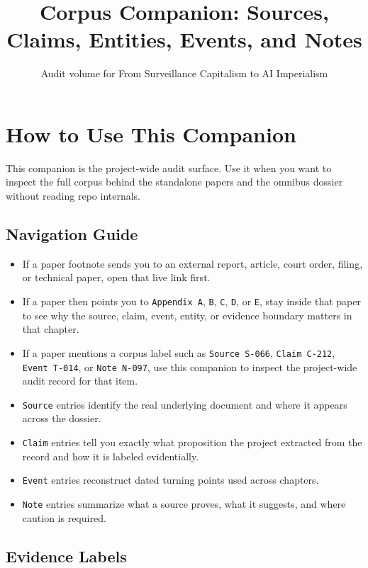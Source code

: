 \documentclass[
  american,
  11pt,
  letterpaper,
]{article}
\title{Corpus Companion: Sources, Claims, Entities, Events, and Notes}
\subtitle{Audit volume for From Surveillance Capitalism to AI
Imperialism}
\author{}
\date{}
\providecommand{\tightlist}{%
  \setlength{\itemsep}{0pt}\setlength{\parskip}{0pt}}
\begin{document}
\maketitle

\section{How to Use This Companion}\label{how-to-use-this-companion}

This companion is the project-wide audit surface. Use it when you want
to inspect the full corpus behind the standalone papers and the omnibus
dossier without reading repo internals.

\subsection{Navigation Guide}\label{navigation-guide}

\begin{itemize}
\tightlist
\item
  If a paper footnote sends you to an external report, article, court
  order, filing, or technical paper, open that live link first.
\item
  If a paper then points you to \texttt{Appendix\ A}, \texttt{B},
  \texttt{C}, \texttt{D}, or \texttt{E}, stay inside that paper to see
  why the source, claim, event, entity, or evidence boundary matters in
  that chapter.
\item
  If a paper mentions a corpus label such as \texttt{Source\ S-066},
  \texttt{Claim\ C-212}, \texttt{Event\ T-014}, or \texttt{Note\ N-097},
  use this companion to inspect the project-wide audit record for that
  item.
\item
  \texttt{Source} entries identify the real underlying document and
  where it appears across the dossier.
\item
  \texttt{Claim} entries tell you exactly what proposition the project
  extracted from the record and how it is labeled evidentially.
\item
  \texttt{Event} entries reconstruct dated turning points used across
  chapters.
\item
  \texttt{Note} entries summarize what a source proves, what it
  suggests, and where caution is required.
\end{itemize}

\subsection{Evidence Labels}\label{evidence-labels}
\end{document}

